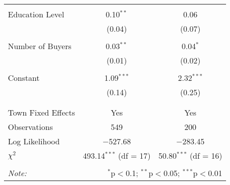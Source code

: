 \begin{table}[!htbp]
\begin{tabular}{@{\extracolsep{5pt}}lcc}
  & & \\ 
 Education Level & 0.10$^{**}$ & 0.06 \\ 
  & (0.04) & (0.07) \\ 
  & & \\ 
 Number of Buyers & 0.03$^{**}$ & 0.04$^{*}$ \\ 
  & (0.01) & (0.02) \\ 
  & & \\ 
 Constant & 1.09$^{***}$ & 2.32$^{***}$ \\ 
  & (0.14) & (0.25) \\ 
  & & \\ 
\hline \\[-1.8ex] 
Town Fixed Effects & Yes & Yes \\ 
Observations & 549 & 200 \\ 
Log Likelihood & $-$527.68 & $-$283.45 \\ 
$\chi^{2}$ & 493.14$^{***}$ (df = 17) & 50.80$^{***}$ (df = 16) \\ 
\hline 
\hline \\[-1.8ex] 
\textit{Note:}  & \multicolumn{2}{r}{$^{*}$p$<$0.1; $^{**}$p$<$0.05; $^{***}$p$<$0.01} \\ 
\end{tabular} 
\end{table} 
